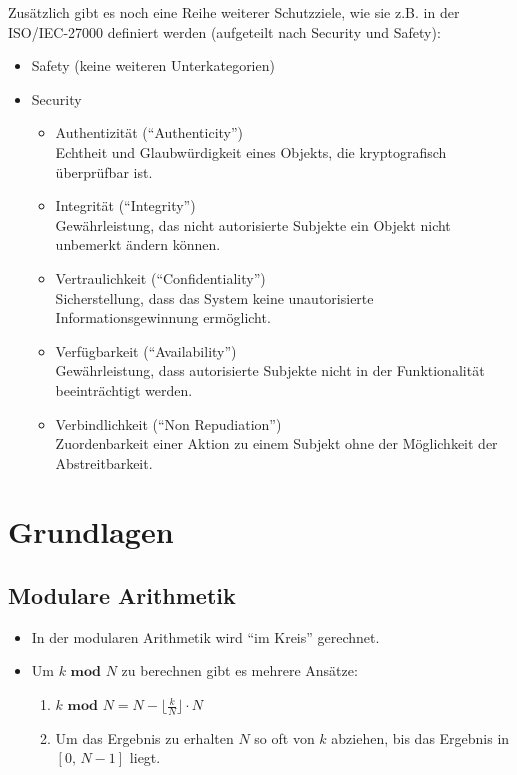 \documentclass[a4paper, 11pt, accentcolor = tud3b]{tudreport}
\begin{document}
		    Zusätzlich gibt es noch eine Reihe weiterer Schutzziele, wie sie z.B. in der ISO/IEC-27000 definiert werden (aufgeteilt nach Security und Safety):
		    \begin{itemize}
		    	\item Safety (keine weiteren Unterkategorien)
		    	\item Security
				    \begin{itemize}
				    	\item Authentizität (\enquote{Authenticity}) \\ Echtheit und Glaubwürdigkeit eines Objekts, die kryptografisch überprüfbar ist.
				    	\item Integrität (\enquote{Integrity}) \\ Gewährleistung, das nicht autorisierte Subjekte ein Objekt nicht unbemerkt ändern können.
				    	\item Vertraulichkeit (\enquote{Confidentiality}) \\ Sicherstellung, dass das System keine unautorisierte Informationsgewinnung ermöglicht.
				    	\item Verfügbarkeit (\enquote{Availability}) \\ Gewährleistung, dass autorisierte Subjekte nicht in der Funktionalität beeinträchtigt werden.
				    	\item Verbindlichkeit (\enquote{Non Repudiation}) \\ Zuordenbarkeit einer Aktion zu einem Subjekt ohne der Möglichkeit der Abstreitbarkeit.
				    \end{itemize}
		    \end{itemize}

    \chapter{Grundlagen}
        \section{Modulare Arithmetik}
            \begin{itemize}
            	\item In der modularen Arithmetik wird \enquote{im Kreis} gerechnet.
            	\item Um \( k \textbf{ mod } N \) zu berechnen gibt es mehrere Ansätze:
	            	\begin{enumerate}
	            		\item \( k \textbf{ mod } N = N - \lfloor \frac{k}{N} \rfloor \cdot N \)
	            		\item Um das Ergebnis zu erhalten \(N\) so oft von \(k\) abziehen, bis das Ergebnis in \( [0,\, N - 1] \) liegt.
	            	\end{enumerate}
            \end{itemize}
            
\end{document}
